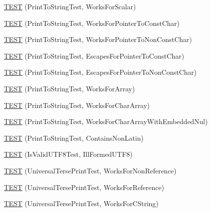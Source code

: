 \begin{DoxyCompactItemize}
\item 
\mbox{\hyperlink{namespacetesting_1_1gtest__printers__test_a5d1bc4b12c18ccaec2ced9f45c092567}{T\+E\+ST}} (Print\+To\+String\+Test, Works\+For\+Scalar)
\item 
\mbox{\hyperlink{namespacetesting_1_1gtest__printers__test_a68100148758516ebab9c761ca7778586}{T\+E\+ST}} (Print\+To\+String\+Test, Works\+For\+Pointer\+To\+Const\+Char)
\item 
\mbox{\hyperlink{namespacetesting_1_1gtest__printers__test_a1db34d8760c17157572ce2877007d15a}{T\+E\+ST}} (Print\+To\+String\+Test, Works\+For\+Pointer\+To\+Non\+Const\+Char)
\item 
\mbox{\hyperlink{namespacetesting_1_1gtest__printers__test_ab8fce4287e837cfcd851ded56b62f9ce}{T\+E\+ST}} (Print\+To\+String\+Test, Escapes\+For\+Pointer\+To\+Const\+Char)
\item 
\mbox{\hyperlink{namespacetesting_1_1gtest__printers__test_a7203081ef422f0835643d2c54b8ebf28}{T\+E\+ST}} (Print\+To\+String\+Test, Escapes\+For\+Pointer\+To\+Non\+Const\+Char)
\item 
\mbox{\hyperlink{namespacetesting_1_1gtest__printers__test_a78bd89af8a8505880b78ec2a001d3cb8}{T\+E\+ST}} (Print\+To\+String\+Test, Works\+For\+Array)
\item 
\mbox{\hyperlink{namespacetesting_1_1gtest__printers__test_ad122dc21e7ebad023d7048ef117a1129}{T\+E\+ST}} (Print\+To\+String\+Test, Works\+For\+Char\+Array)
\item 
\mbox{\hyperlink{namespacetesting_1_1gtest__printers__test_a65e208358dddc7747f4519410c71d877}{T\+E\+ST}} (Print\+To\+String\+Test, Works\+For\+Char\+Array\+With\+Embedded\+Nul)
\item 
\mbox{\hyperlink{namespacetesting_1_1gtest__printers__test_aa313c2e91ba3b712501d6e7f393a592a}{T\+E\+ST}} (Print\+To\+String\+Test, Contains\+Non\+Latin)
\item 
\mbox{\hyperlink{namespacetesting_1_1gtest__printers__test_a5d5349c44a2f23e585ea503cff88056e}{T\+E\+ST}} (Is\+Valid\+U\+T\+F8\+Test, Ill\+Formed\+U\+T\+F8)
\item 
\mbox{\hyperlink{namespacetesting_1_1gtest__printers__test_ab49ff6527b0b01411b725fe46e1af65c}{T\+E\+ST}} (Universal\+Terse\+Print\+Test, Works\+For\+Non\+Reference)
\item 
\mbox{\hyperlink{namespacetesting_1_1gtest__printers__test_ab7adb58a0e08e0830157a5a1c7bceac5}{T\+E\+ST}} (Universal\+Terse\+Print\+Test, Works\+For\+Reference)
\item 
\mbox{\hyperlink{namespacetesting_1_1gtest__printers__test_ab11252e228a240a349d747546bc222d2}{T\+E\+ST}} (Universal\+Terse\+Print\+Test, Works\+For\+C\+String)

\end{DoxyCompactItemize}
